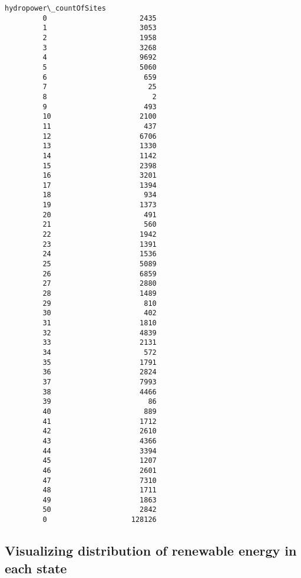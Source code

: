 \documentclass[11pt]{article}
\begin{document}
\begin{Verbatim}[commandchars=\\\{\}]
             hydropower\_countOfSites  
         0                      2435  
         1                      3053  
         2                      1958  
         3                      3268  
         4                      9692  
         5                      5060  
         6                       659  
         7                        25  
         8                         2  
         9                       493  
         10                     2100  
         11                      437  
         12                     6706  
         13                     1330  
         14                     1142  
         15                     2398  
         16                     3201  
         17                     1394  
         18                      934  
         19                     1373  
         20                      491  
         21                      560  
         22                     1942  
         23                     1391  
         24                     1536  
         25                     5089  
         26                     6859  
         27                     2880  
         28                     1489  
         29                      810  
         30                      402  
         31                     1810  
         32                     4839  
         33                     2131  
         34                      572  
         35                     1791  
         36                     2824  
         37                     7993  
         38                     4466  
         39                       86  
         40                      889  
         41                     1712  
         42                     2610  
         43                     4366  
         44                     3394  
         45                     1207  
         46                     2601  
         47                     7310  
         48                     1711  
         49                     1863  
         50                     2842  
         0                    128126  
\end{Verbatim}
            
    \subsection{Visualizing distribution of renewable energy in each
state}\label{visualizing-distribution-of-renewable-energy-in-each-state}
\end{document}
